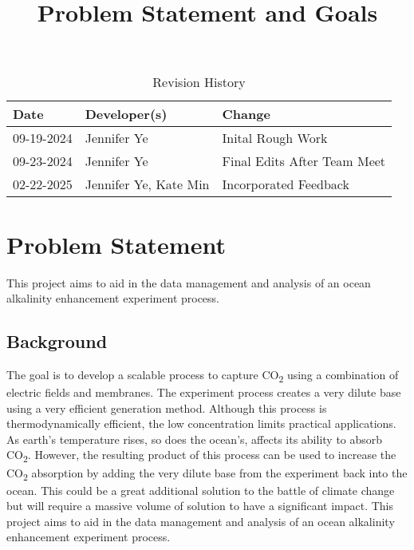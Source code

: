 \documentclass{article}
\title{Problem Statement and Goals\\\progname}
\author{\authname}
\date{}
\begin{document}
\maketitle

\begin{table}[hp]
\caption{Revision History} \label{TblRevisionHistory}
\begin{tabularx}{\textwidth}{llX}
\toprule
\textbf{Date} & \textbf{Developer(s)} & \textbf{Change}\\
\midrule
09-19-2024 & Jennifer Ye & Inital Rough Work \\
09-23-2024 & Jennifer Ye & Final Edits After Team Meet\\
02-22-2025 & Jennifer Ye, Kate Min & Incorporated Feedback\\ 
\bottomrule
\end{tabularx}
\end{table}



\section{Problem Statement}
This project aims to aid in the data management and analysis of an ocean
alkalinity enhancement experiment process.

\subsection{Background}
The goal is to develop a scalable process to capture CO\textsubscript{2} using a
combination of electric fields and membranes. The experiment process creates a
very dilute base using a very efficient generation method. Although this process
is thermodynamically efficient, the low concentration limits practical
applications. As earth's temperature rises, so does the ocean's, affects its
ability to absorb CO\textsubscript{2}. However, the resulting product of this
process can be used to increase the CO\textsubscript{2} absorption by adding the
very dilute base from the experiment back into the ocean. This could be a great
additional solution to the battle of climate change but will require a massive
volume of solution to have a significant impact.
This project aims to aid in the data management and analysis of an ocean
alkalinity enhancement experiment process.
\end{document}
